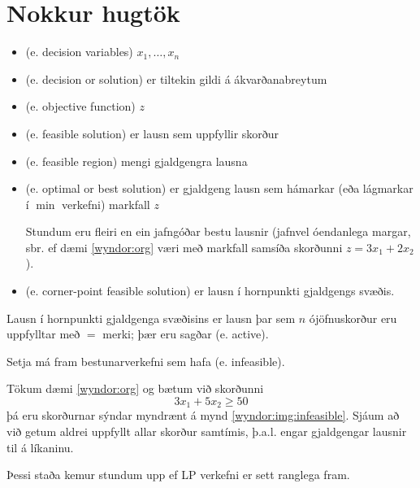 \section{Nokkur hugtök}


\begin{itemize}
\item {} (e. decision variables) $x_1,\ldots,x_n$
\item {} (e. decision or solution) er tiltekin gildi á ákvarðana\-breytum
\item {} (e. objective function) $z$
\item {} (e. feasible solution) er lausn sem uppfyllir skorður
\item {} (e. feasible region) mengi gjaldgengra lausna
\item {} (e. optimal or best solution) er gjaldgeng lausn sem hámarkar (eða lágmarkar í $\min$  verkefni) markfall $z$
\begin{aths}
Stundum eru fleiri en ein jafngóðar bestu lausnir (jafnvel óendanlega margar, sbr. ef dæmi \ref{wyndor:org} væri með markfall samsíða skorðunni $z=3x_1+2x_2$).
\end{aths}
\item {} (e. corner-point feasible solution) er lausn í hornpunkti gjaldgengs svæðis.
\end{itemize}

Lausn í hornpunkti gjaldgenga svæðisins er lausn þar sem $n$ ójöfnuskorður eru uppfylltar með $=$ merki; þær eru sagðar  (e. active).

Setja má fram bestunarverkefni sem hafa  (e. infeasible).
\begin{daemi}\label{wyndor:infeasible}
Tökum dæmi \ref{wyndor:org} og bætum við skorðunni $$3x_1+5x_2\geq 50$$ þá eru skorðurnar sýndar myndrænt á mynd \ref{wyndor:img:infeasible}. Sjáum að við getum aldrei uppfyllt allar skorður samtímis, þ.a.l. engar gjaldgengar lausnir til á líkaninu.
\end{daemi}

\begin{aths}
 Þessi staða kemur stundum upp ef LP verkefni er sett ranglega fram.
\end{aths}

